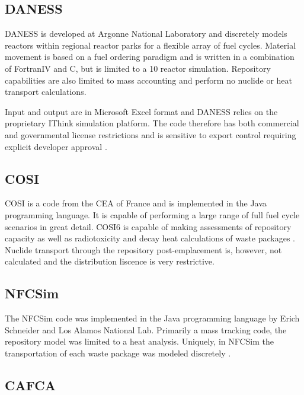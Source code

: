 \subsection{DANESS} 

\gls{DANESS} is developed at Argonne National Laboratory and
discretely models reactors within regional reactor parks for a flexible array 
of fuel cycles. Material movement is based on a fuel ordering paradigm and is 
written in a combination of FortranIV and C, but is limited to a 10 reactor 
simulation.  Repository capabilities are also limited to mass accounting and 
perform no nuclide or heat transport calculations. 

Input and output are in Microsoft Excel format and \gls{DANESS} relies on the 
proprietary IThink simulation platform. The code therefore has both commercial 
and governmental license restrictions and is sensitive to export control 
requiring explicit developer approval 
\cite{yacout_daness_2011,van_den_durpel_daness:_2006}. 



\subsection{COSI}

\gls{COSI} is a code from the \gls{CEA} of France and is implemented in the Java programming 
language. It is capable of performing a large range of full fuel cycle 
scenarios in great detail. COSI6 is capable of making assessments of repository capacity as 
well as radiotoxicity and decay heat calculations of waste packages
\cite{boucher_international_2010}. Nuclide transport through the repository 
post-emplacement is, however, not calculated and the distribution liscence is 
very restrictive.


\subsection{NFCSim}

The \gls{NFCSim} code was implemented in the Java programming language by Erich 
Schneider and Los Alamos National Lab. Primarily a mass tracking code, the 
repository model was limited to a heat analysis. Uniquely, in NFCSim the 
transportation of each waste package was modeled discretely 
\cite{schneider_nfcsim_2004}.

\subsection{CAFCA}

